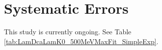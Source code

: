 \documentclass[../AnalysisNoteJBuxton.tex]{subfiles}
\begin{document}
\section{Systematic Errors}
\label{SystematicErrors}

This study is currently ongoing.  See Table \ref{tab:LamDcaLamK0_500MeVMaxFit_SimpleExp}.



\end{document}
